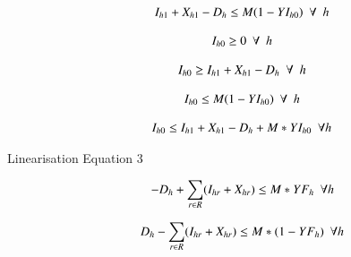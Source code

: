 \documentclass{elsarticle}
\begin{document}
  	\begin{equation}
	\begin{array}{ll@{}ll}
	& \displaystyle I_{h1} + X_{h1} - D_{h} \leq M(1-YI_{h0}) \ \ \forall \ \ h\\
	\end{array}
	\label{eq:Eq33}	
	\end{equation}

  	\begin{equation}
	\begin{array}{ll@{}ll}
	& \displaystyle I_{h0} \geq 0 \ \ \forall \ \ h\\
	\end{array}
	\label{eq:Eq33}	
	\end{equation}


  	\begin{equation}
	\begin{array}{ll@{}ll}
	& \displaystyle I_{h0} \geq I_{h1} + X_{h1} - D_{h} \ \ \forall \ \ h\\
	\end{array}
	\label{eq:Eq33}	
	\end{equation}

  	\begin{equation}
	\begin{array}{ll@{}ll}
	& \displaystyle I_{h0} \leq M(1-YI_{h0}) \ \ \forall \ \ h\\
	\end{array}
	\label{eq:Eq33}	
	\end{equation}

	\begin{equation}
	\begin{array}{ll@{}ll}
	& \displaystyle I_{h0} \leq I_{h1} + X_{h1} - D_{h} +M*YI_{h0} \ \ \forall h\\
	\end{array}
	\label{eq:Eq32}
	\end{equation}	
	
	
Linearisation Equation 3
	
	\begin{equation}
	\begin{array}{ll@{}ll}
	& \displaystyle - D_{h} + \sum\limits_{r \in R}(I_{hr} + X_{hr}) \leq M*YF_{h} \ \ \forall h\\
	\end{array}
	\label{eq:Eq32}
	\end{equation}	
	
	\begin{equation}
	\begin{array}{ll@{}ll}
	& \displaystyle D_{h} - \sum\limits_{r \in R}(I_{hr} + X_{hr}) \leq M*(1-YF_{h}) \ \ \forall h\\
	\end{array}
	\label{eq:Eq32}
	\end{equation}	
	
\end{document}
